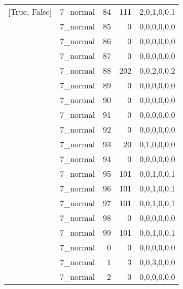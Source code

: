 \begin{tabular}{llrrl}
 [True, False]   & 7\_normal            &            84 &                   111 & 2,0,1,0,0,1   \\
 [True, False]   & 7\_normal            &            85 &                     0 & 0,0,0,0,0,0   \\
 [True, False]   & 7\_normal            &            86 &                     0 & 0,0,0,0,0,0   \\
 [True, False]   & 7\_normal            &            87 &                     0 & 0,0,0,0,0,0   \\
 [True, False]   & 7\_normal            &            88 &                   202 & 0,0,2,0,0,2   \\
 [True, False]   & 7\_normal            &            89 &                     0 & 0,0,0,0,0,0   \\
 [True, False]   & 7\_normal            &            90 &                     0 & 0,0,0,0,0,0   \\
 [True, False]   & 7\_normal            &            91 &                     0 & 0,0,0,0,0,0   \\
 [True, False]   & 7\_normal            &            92 &                     0 & 0,0,0,0,0,0   \\
 [True, False]   & 7\_normal            &            93 &                    20 & 0,1,0,0,0,0   \\
 [True, False]   & 7\_normal            &            94 &                     0 & 0,0,0,0,0,0   \\
 [True, False]   & 7\_normal            &            95 &                   101 & 0,0,1,0,0,1   \\
 [True, False]   & 7\_normal            &            96 &                   101 & 0,0,1,0,0,1   \\
 [True, False]   & 7\_normal            &            97 &                   101 & 0,0,1,0,0,1   \\
 [True, False]   & 7\_normal            &            98 &                     0 & 0,0,0,0,0,0   \\
 [True, False]   & 7\_normal            &            99 &                   101 & 0,0,1,0,0,1   \\
 [True, False]   & 7\_normal            &             0 &                     0 & 0,0,0,0,0,0   \\
 [True, False]   & 7\_normal            &             1 &                     3 & 0,0,3,0,0,0   \\
 [True, False]   & 7\_normal            &             2 &                     0 & 0,0,0,0,0,0   \\

\end{tabular}

